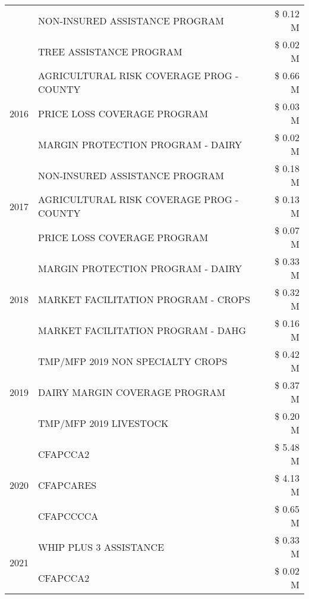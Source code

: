 \begin{tabular}{llr}
 & NON-INSURED ASSISTANCE PROGRAM & \$ 0.12 M \\
 & TREE ASSISTANCE PROGRAM & \$ 0.02 M \\
\cline{1-3}
\multirow[t]{3}{*}{2016} & AGRICULTURAL RISK COVERAGE PROG - COUNTY & \$ 0.66 M \\
 & PRICE LOSS COVERAGE PROGRAM & \$ 0.03 M \\
 & MARGIN PROTECTION PROGRAM - DAIRY & \$ 0.02 M \\
\cline{1-3}
\multirow[t]{3}{*}{2017} & NON-INSURED ASSISTANCE PROGRAM & \$ 0.18 M \\
 & AGRICULTURAL RISK COVERAGE PROG - COUNTY & \$ 0.13 M \\
 & PRICE LOSS COVERAGE PROGRAM & \$ 0.07 M \\
\cline{1-3}
\multirow[t]{3}{*}{2018} & MARGIN PROTECTION PROGRAM - DAIRY & \$ 0.33 M \\
 & MARKET FACILITATION PROGRAM - CROPS & \$ 0.32 M \\
 & MARKET FACILITATION PROGRAM - DAHG & \$ 0.16 M \\
\cline{1-3}
\multirow[t]{3}{*}{2019} & TMP/MFP 2019 NON SPECIALTY CROPS & \$ 0.42 M \\
 & DAIRY MARGIN COVERAGE PROGRAM & \$ 0.37 M \\
 & TMP/MFP 2019 LIVESTOCK & \$ 0.20 M \\
\cline{1-3}
\multirow[t]{3}{*}{2020} & CFAPCCA2 & \$ 5.48 M \\
 & CFAPCARES & \$ 4.13 M \\
 & CFAPCCCCA & \$ 0.65 M \\
\cline{1-3}
\multirow[t]{2}{*}{2021} & WHIP PLUS 3 ASSISTANCE & \$ 0.33 M \\
 & CFAPCCA2 & \$ 0.02 M \\
\cline{1-3}
\bottomrule
\end{tabular}
